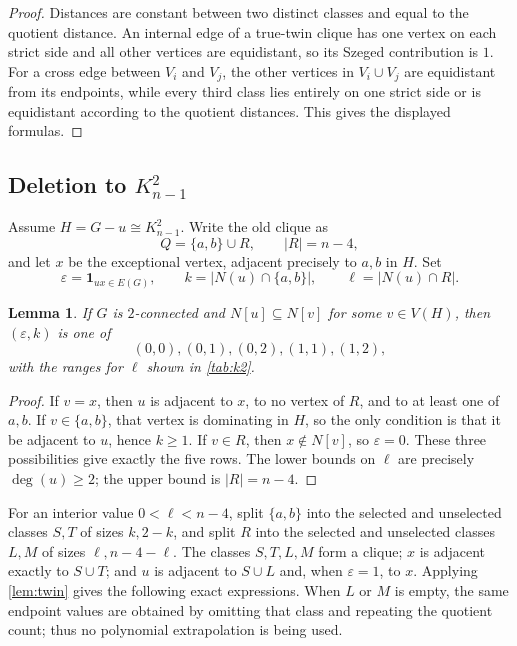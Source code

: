\documentclass[11pt,reqno]{amsart}
\newtheorem{lemma}[lemma]{Lemma}
\theoremstyle{definition}
\theoremstyle{remark}
\begin{document}
\begin{proof}
Distances are constant between two distinct classes and equal to the quotient
distance.  An internal edge of a true-twin clique has one vertex on each
strict side and all other vertices are equidistant, so its Szeged contribution
is $1$.  For a cross edge between $V_i$ and $V_j$, the other vertices in
$V_i\cup V_j$ are equidistant from its endpoints, while every third class
lies entirely on one strict side or is equidistant according to the quotient
distances.  This gives the displayed formulas.
\end{proof}

\subsection{Deletion to \texorpdfstring{$K_{n-1}^2$}{K(n-1,2)}}

Assume $H=G-u\cong K_{n-1}^2$.  Write the old clique as
\[
 Q=\{a,b\}\cup R,\qquad |R|=n-4,
\]
and let $x$ be the exceptional vertex, adjacent precisely to $a,b$ in $H$.
Set
\[
 \varepsilon=\mathbf 1_{ux\in E(G)},\qquad
 k=|N(u)\cap\{a,b\}|,\qquad
 \ell=|N(u)\cap R|.
\]

\begin{lemma}\label{lem:k2patterns}
If $G$ is $2$-connected and $N[u]\subseteq N[v]$ for some $v\in V(H)$,
then $(\varepsilon,k)$ is one of
\[
 (0,0),(0,1),(0,2),(1,1),(1,2),
\]
with the ranges for $\ell$ shown in \cref{tab:k2}.
\end{lemma}

\begin{proof}
If $v=x$, then $u$ is adjacent to $x$, to no vertex of $R$, and to at least
one of $a,b$.  If $v\in\{a,b\}$, that vertex is dominating in $H$, so the
only condition is that it be adjacent to $u$, hence $k\ge1$.  If $v\in R$,
then $x\notin N[v]$, so $\varepsilon=0$.  These three possibilities give
exactly the five rows.  The lower bounds on $\ell$ are precisely
$\deg(u)\ge2$; the upper bound is $|R|=n-4$.
\end{proof}

For an interior value $0<\ell<n-4$, split $\{a,b\}$ into the selected and
unselected classes $S,T$ of sizes $k,2-k$, and split $R$ into the selected
and unselected classes $L,M$ of sizes $\ell,n-4-\ell$.  The classes
$S,T,L,M$ form a clique; $x$ is adjacent exactly to $S\cup T$; and $u$ is
adjacent to $S\cup L$ and, when $\varepsilon=1$, to $x$.  Applying
\cref{lem:twin} gives the following exact expressions.  When $L$ or $M$ is
empty, the same endpoint values are obtained by omitting that class and
repeating the quotient count; thus no polynomial extrapolation is being used.
\end{document}
